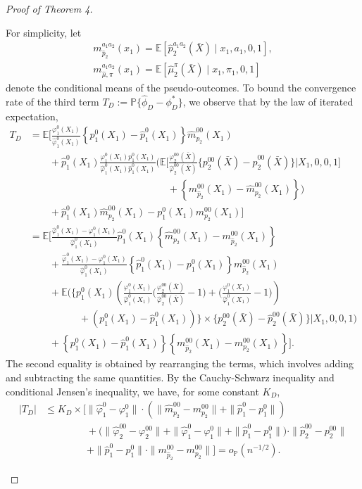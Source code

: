 \documentclass{article}
\newcommand{\wh}{\widehat}
\newcommand{\pk}{{\varphi}}
\newcommand{\pr}{\mathbb{P}}
\begin{document}
\begin{proof}[Proof of Theorem 4]
\begin{enumerate}
	For simplicity, let  
	\begin{gather*}
		m_{\wh p_2}^{a_1a_2}(x_1) = \mathbb E[\wh p_2^{a_1a_2}(\bar X) \mid x_1,a_1,0,1], \\
		m_{\wh \mu, \pi}^{a_1a_2}(x_1) = \mathbb E[\wh \mu_2^{\pi}(\bar X) \mid x_1,\pi_1,0,1]
	\end{gather*}
	denote the conditional means of the pseudo-outcomes. To bound the convergence rate of the third term $T_D := \mathbb P\{ \hat\phi_D - \phi_D^* \}$, we observe that by the law of iterated expectation,
	\begin{align*}
		T_D &= \mathbb E \bigg[
		\frac{{\pk}_1^0(X_1)}{\wh{\pk}_1^0(X_1)} \left\{p_1^0(X_1) - \wh p_1^0(X_1)\right\} \wh m_{p_2}^{00}(X_1) \\
		&\qquad+ \wh p_1^0(X_1) \frac{\pk_1^0(X_1) p_1^0(X_1)} {\wh\pk_1^0(X_1) \wh p_1^0(X_1)} \bigg( 
		  \mathbb E\bigg[\frac{\pk_2^{00}(\bar X)}{\wh\pk_2^{00}(\bar X)}
		  \big\{p_2^{00}(\bar X) - \wh p_2^{00}(\bar X)\big\} | X_1,0,0,1\bigg] \\
		&\qquad\qquad\qquad\qquad
		 \qquad\qquad\qquad+ 
			   \left\{ m_{\wh p_2}^{00}(X_1) - \wh m_{p_2}^{00}(X_1) \right\} \bigg) \\
		&\qquad+ \wh p_1^0(X_1) \wh m_{p_2}^{00}(X_1)
		 - p_1^0(X_1) m_{p_2}^{00}(X_1)
		\bigg] \\
		&= \mathbb E \Bigg[
		\frac{\wh\pk_1^0(X_1) - \pk_1^0(X_1)}{\wh\pk_1^0(X_1)} \wh p_1^0(X_1) \left\{ \wh m_{p_2}^{00}(X_1) - m_{\hat p_2}^{00}(X_1) \right\} \\
		  &\qquad+ 
		   \frac{\wh\pk_1^0(X_1) - \pk_1^0(X_1)}{\wh\pk_1^0(X_1)} \left\{ \wh p_1^0(X_1) - p_1^0(X_1) \right\} m_{\wh p_2}^{00}(X_1) \\
		   &\qquad+ \mathbb E\bigg(
		    \bigg\{ p_1^0(X_1) \left(
	 	    \frac{\pk_1^0(X_1)}{\wh\pk_1^0(X_1)} \big(\frac{\pk_2^{00}(\bar X)}{\wh\pk_2^{00}(\bar X)} - 1\big) + \big(\frac{\pk_1^0(X_1)}{\wh\pk_1^0(X_1)} - 1\big) 
		    \right) \\
		    &\quad\qquad\qquad+ (p_1^0(X_1) - \wh p_1^0(X_1)) \bigg\} \times \{p_2^{00}(\bar X) - \wh p_2^{00}(\bar X)\}
		    | X_1,0,0,1\bigg) \\
		  &\qquad+
		   \left\{ p_1^0(X_1) - \wh p_1^0(X_1) \right\} \left\{ m_{\wh p_2}^{00}(X_1) - m_{p_2}^{00}(X_1) \right\} \Bigg]
		  .
	\end{align*}
	The second equality is obtained by rearranging the terms, which involves adding and subtracting the same quantities. By the Cauchy-Schwarz inequality and conditional Jensen's inequality, we have, for some constant $K_D$,
	\begin{align*}
		|T_D| &\le
		  K_D \times \bigg[
		  \|\wh\pk_1^0 - \pk_1^0\| \cdot \left( \|\wh m_{p_2}^{00} - m_{p_2}^{00}\| + \|\wh p_1^0 - p_1^0\| \right) \\
		  &\;\qquad\qquad+
		   \Big(\|\wh\pk_2^{00}-\pk_2^{00}\| + \|\wh\pk_1^{0}-\pk_1^{0}\| + \|\wh p_1^{0} - p_1^{0}\|\Big) \cdot \|\wh p_2^{00} - p_2^{00}\| \\
		  &\;\qquad\qquad+
		   \|\wh p_1^0 - p_1^0\| \cdot \|m_{\wh p_2}^{00} - m_{p_2}^{00}\|
		  \bigg] = o_{\pr}(n^{-1/2}).
	\end{align*}


\end{enumerate}
\end{proof}
\end{document}
